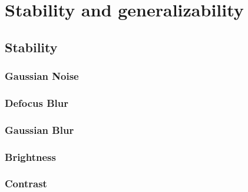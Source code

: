 \section{Stability and generalizability}
\subsection{Stability}
\subsubsection{Gaussian Noise}
\subsubsection{Defocus Blur}
\subsubsection{Gaussian Blur}
\subsubsection{Brightness}
\subsubsection{Contrast}
